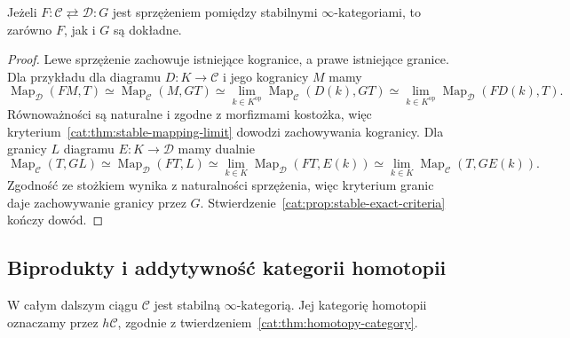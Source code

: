 \begin{wniosek}\label{cat:cor:stable-adjoint-exact}
Jeżeli $F:\mathcal C\rightleftarrows\mathcal D:G$ jest sprzężeniem pomiędzy stabilnymi $\infty$-kategoriami, to zarówno $F$, jak i $G$ są dokładne.
\end{wniosek}
\begin{proof}
Lewe sprzężenie zachowuje istniejące kogranice, a prawe istniejące granice. Dla przykładu dla diagramu $D:K\to\mathcal C$ i jego kogranicy $M$ mamy
\[
 \operatorname{Map}_{\mathcal D}(FM,T)
 \simeq\operatorname{Map}_{\mathcal C}(M,GT)
 \simeq\lim_{k\in K^{\mathrm{op}}}
           \operatorname{Map}_{\mathcal C}(D(k),GT)
 \simeq\lim_{k\in K^{\mathrm{op}}}
           \operatorname{Map}_{\mathcal D}(FD(k),T).
\]
Równoważności są naturalne i zgodne z morfizmami kostożka, więc kryterium~\ref{cat:thm:stable-mapping-limit} dowodzi zachowywania kogranicy. Dla granicy $L$ diagramu $E:K\to\mathcal D$ mamy dualnie
\[
 \operatorname{Map}_{\mathcal C}(T,GL)
 \simeq\operatorname{Map}_{\mathcal D}(FT,L)
 \simeq\lim_{k\in K}\operatorname{Map}_{\mathcal D}(FT,E(k))
 \simeq\lim_{k\in K}\operatorname{Map}_{\mathcal C}(T,GE(k)).
\]
Zgodność ze stożkiem wynika z naturalności sprzężenia, więc kryterium granic daje zachowywanie granicy przez $G$. Stwierdzenie~\ref{cat:prop:stable-exact-criteria} kończy dowód.
\end{proof}

\subsection{Biprodukty i addytywność kategorii homotopii}

W całym dalszym ciągu $\mathcal C$ jest stabilną $\infty$-kategorią. Jej kategorię homotopii oznaczamy przez $h\mathcal C$, zgodnie z twierdzeniem~\ref{cat:thm:homotopy-category}.

